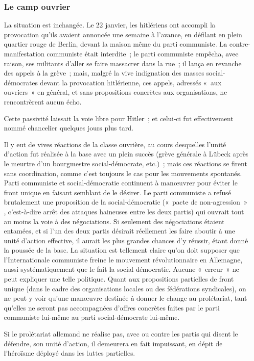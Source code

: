 \documentclass[french,twoside]{book} %
\begin{document}
\subsubsection[Le camp ouvrier]{Le camp ouvrier}
\noindent La situation est inchangée. Le 22 janvier, les hitlériens ont accompli la provocation qu'ils avaient annoncée une semaine à l'avance, en défilant en plein quartier rouge de Berlin, devant la maison même du parti communiste. La contre-manifestation communiste était interdite ; le parti communiste empêcha, avec raison, ses militants d'aller se faire massacrer dans la rue ; il lança en revanche des appels à la grève ; mais, malgré la vive indignation des masses social-démocrates devant la provocation hitlérienne, ces appels, adressés « aux ouvriers » en général, et sans propositions concrètes aux organisations, ne rencontrèrent aucun écho.\par
Cette passivité laissait la voie libre pour Hitler ; et celui-ci fut effective­ment nommé chancelier quelques jours plus tard.\par
Il y eut de vives réactions de la classe ouvrière, au cours desquelles l'unité d'action fut réalisée à la base avec un plein succès (grève générale à Lübeck après le meurtre d'un bourgmestre social-démocrate, etc.) ; mais ces réactions se firent sans coordination, comme c'est toujours le cas pour les mouvements spontanés. Parti communiste et social-démocratie continuent à manœuvrer pour éviter le front unique en faisant semblant de le désirer. Le parti commu­niste a refusé brutalement une proposition de la social-démocratie (« pacte de non-agression » , c'est-à-dire arrêt des attaques haineuses entre les deux partis) qui ouvrait tout au moins la voie à des négociations. Si seulement des négociations étaient entamées, et si l'un des deux partis désirait réellement les faire aboutir à une unité d'action effective, il aurait les plus grandes chances d'y réussir, étant donné la poussée de la base. La situation est tellement claire qu'on doit supposer que l'Internationale communiste freine le mouvement révolutionnaire en Allemagne, aussi systématiquement que le fait la social-démocratie. Aucune « erreur » ne peut expliquer une telle politique. Quant aux propositions partielles de front unique (dans le cadre des organisations locales ou des fédérations syndicales), on ne peut y voir qu'une manœuvre destinée à donner le change au prolétariat, tant qu'elles ne seront pas accompagnées d'offres concrètes faites par le parti communiste lui-même au parti social-démocrate lui-même.\par
Si le prolétariat allemand ne réalise pas, avec ou contre les partis qui disent le défendre, son unité d'action, il demeurera en fait impuissant, en dépit de l'héroïsme déployé dans les luttes partielles.\par
\end{document}
